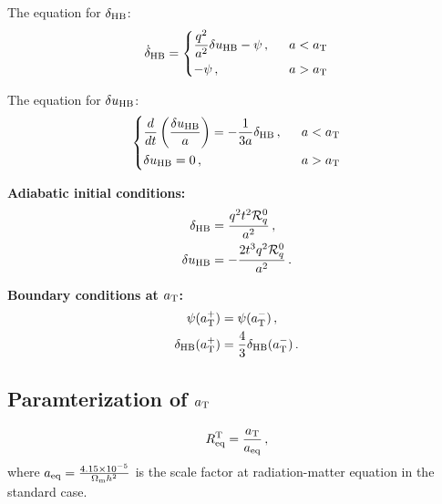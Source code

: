 \documentclass[preprint,nofootinbib,aps,prd,showpacs,superscriptaddress,groupedaddress,amsmath,longbibliography]{revtex4-1}
\begin{document}
The equation for $\delta_{\rm{HB}}$:
\begin{equation}\label{eq:delta_hb-dot}
    \dot{\delta}_{\rm{HB}} = 
    \begin{dcases}
    \frac{q^2}{a^2}\delta u_{\rm{HB}} -\psi\,,  &  ~~ a< a_{\rm{T}} \\
      -\psi\,, & ~~ a> a_{\rm{T}}
    \end{dcases}
\end{equation}

The equation for $\delta u_{\rm{HB}}$:
\begin{equation}\label{eq:v_hb-dot}
    \begin{dcases}
     \frac{d}{dt}\left(\frac{\delta u_{\rm{HB}}}{a}\right) =-\frac{1}{3a}\delta_{\rm{HB}}\,, &  ~~a<a_{\rm{T}} \\
     \delta u_{\rm{HB}} = 0\,, & ~~ a> a_{\rm{T}}
    \end{dcases}
\end{equation}



{\flushleft \textbf{Adiabatic initial conditions:}}
\begin{align}
    \delta_{\rm{HB}} & = \frac{q^2t^2\mathcal{R}^0_q}{a^2}\,,\label{eq:delta_hb_init}\\
    \delta u_{\rm{HB}} & = -\frac{2t^3q^2\mathcal{R}^0_q}{a^2}\,.\label{eq:v_hb_init}
\end{align}

{\flushleft \textbf{Boundary conditions at $a_{\rm{T}}$:}}
\begin{align}
    \psi(a^{+}_{\rm{T}}) &=  \psi(a^{-}_{\rm{T}})\,, \label{eq:psi-bc}\\ 
    \delta_{\rm{HB}}(a^{+}_{\rm{T}}) &=  \frac{4}{3} \delta_{\rm{HB}}(a^{-}_{\rm{T}})\,. \label{eq:delta_hb-bc}
\end{align}


\subsection{Paramterization of $a_{\rm{T}}$}
\begin{equation}\label{eq:a_t-parameterization}
    R^{\rm{T}}_{\rm{eq}} = \frac{a_{\rm{T}}}{a_{\rm{eq}}}\,,
\end{equation}
where $a_{\rm{eq}} = \frac{4.15\times10^{-5}}{\Omega_{\rm{m}}h^2}$ is the scale factor at radiation-matter equation in the standard case. 




\end{document}
